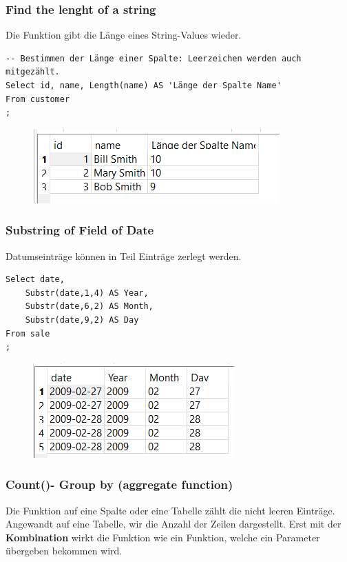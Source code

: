 \subsubsection{Find the lenght of a string}
Die Funktion  gibt die Länge eines String-Values wieder.
\begin{lstlisting}[style=SQL]
-- Bestimmen der Länge einer Spalte: Leerzeichen werden auch mitgezählt.
Select id, name, Length(name) AS 'Länge der Spalte Name'
From customer
; 
\end{lstlisting}

\begin{figure}[H]
	\centering
	\includegraphics[scale = 0.6]{attachment/chapter_3/Scc062}
	\caption{}
	\label{fig:Scc062}
\end{figure}

\subsubsection{Substring of Field of Date}
Datumseinträge können in Teil Einträge zerlegt werden.
\begin{lstlisting}[style=SQL]
Select date, 
	Substr(date,1,4) AS Year,
	Substr(date,6,2) AS Month,
	Substr(date,9,2) AS Day
From sale
;
\end{lstlisting}
\begin{figure}[H]
	\centering
	\includegraphics[scale = 0.6]{attachment/chapter_3/Scc063}
	\caption{}
	\label{fig:Scc063}
\end{figure}



\subsubsection{Count()- Group by (aggregate function)}
Die  Funktion auf eine Spalte oder eine Tabelle zählt die nicht leeren Einträge. Angewandt auf eine Tabelle, wir die Anzahl der Zeilen dargestellt. Erst mit der \textbf{Kombination}  wirkt die Funktion wie ein Funktion, welche ein Parameter übergeben bekommen wird. \\

